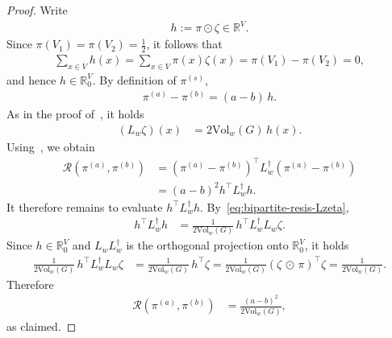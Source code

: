 \documentclass[11pt,a4paper]{article}
\newcommand{\Resis}{\mathcal{R}}
\newcommand{\Vol}{\mathrm{Vol}}
\begin{document}
\begin{proof}
    Write
        \begin{align*}
            h := \pi \odot \zeta \in \mathbb{R}^{V}.
        \end{align*}
    Since $\pi(V_1)=\pi(V_2)=\frac12$, it follows that
        \begin{align*}
            \sum_{x\in V} h(x) = \sum_{x\in V} \pi(x)\zeta(x) = \pi(V_1)-\pi(V_2)=0,
        \end{align*}
    and hence $h\in\mathbb{R}^{V}_0$. By definition of $\pi^{(s)}$,
        \begin{align}\label{eq:bipartite-resis-difference}
            \pi^{(a)} - \pi^{(b)} = (a-b)\,h.
        \end{align}
    As in the proof of~, it holds
        \begin{align}\label{eq:bipartite-resis-Lzeta}
            (L_{w}\zeta)(x) &= 2\Vol_w(G)\,h(x).
        \end{align}
    Using~, we obtain
        \begin{align*}
            \Resis(\pi^{(a)},\pi^{(b)})
            &= (\pi^{(a)}-\pi^{(b)})^\top L_w^\dagger (\pi^{(a)}-\pi^{(b)}) \\
            &= (a-b)^2 h^\top L_w^\dagger h.
        \end{align*}
    It therefore remains to evaluate $h^\top L_w^\dagger h$. By~\cref{eq:bipartite-resis-Lzeta},
        \begin{align*}
            h^\top L_w^\dagger h
            &= \frac{1}{2\Vol_w(G)}\, h^\top L_w^\dagger L_w \zeta.
        \end{align*}
    Since $h\in\mathbb{R}^{V}_0$ and $L_w L_w^\dagger$ is the orthogonal projection onto $\mathbb{R}^{V}_0$, it holds
        \begin{align*}
            \frac{1}{2\Vol_w(G)}\, h^\top L_w^\dagger L_w \zeta &= \frac{1}{2\Vol_w(G)}\, h^\top \zeta =  \frac{1}{2\Vol_w(G)} (\zeta\,\odot\,\pi)^\top\zeta = \frac{1}{2\Vol_w(G)}.
        \end{align*}
    Therefore
        \begin{align*}
            \Resis(\pi^{(a)},\pi^{(b)}) &= \frac{(a-b)^2}{2\Vol_w(G)},
        \end{align*}
    as claimed.
\end{proof}
\end{document}
